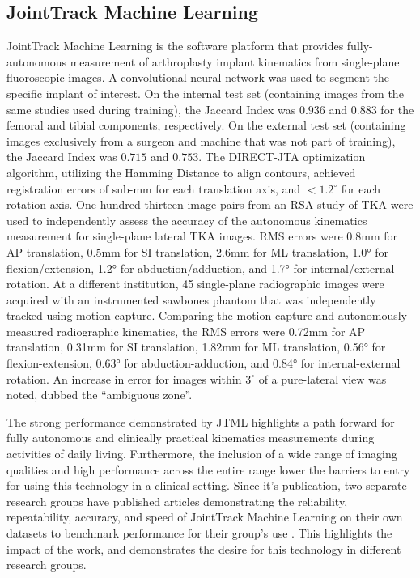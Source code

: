\subsection{JointTrack Machine Learning}
JointTrack Machine Learning is the software platform that provides fully-autonomous measurement of arthroplasty implant kinematics from single-plane fluoroscopic images.
A convolutional neural network was used to segment the specific implant of interest.
On the internal test set (containing images from the same studies used during training), the Jaccard Index was $0.936$ and $0.883$ for the femoral and tibial components, respectively.
On the external test set (containing images exclusively from a surgeon and machine that was not part of training), the Jaccard Index was $0.715$ and $0.753$.
The DIRECT-JTA optimization algorithm, utilizing the Hamming Distance to align contours, achieved registration errors of sub-mm for each translation axis, and $<1.2^{\circ}$ for each rotation axis.
One-hundred thirteen image pairs from an RSA study of TKA were used to independently assess the accuracy of the autonomous kinematics measurement for single-plane lateral TKA images.
RMS errors were 0.8mm for AP translation, 0.5mm for SI translation, 2.6mm for ML translation, 1.0° for flexion/extension, 1.2° for abduction/adduction, and 1.7° for internal/external rotation.
At a different institution, 45 single-plane radiographic images were acquired with an instrumented sawbones phantom that was independently tracked using motion capture.
Comparing the motion capture and autonomously measured radiographic kinematics, the RMS errors were 0.72mm for AP translation, 0.31mm for SI translation, 1.82mm for ML translation, 0.56° for flexion-extension, 0.63° for abduction-adduction, and 0.84° for internal-external rotation.
An increase in error for images within $3^{\circ}$ of a pure-lateral view was noted, dubbed the ``ambiguous zone''.

The strong performance demonstrated by JTML highlights a path forward for fully autonomous and clinically practical kinematics measurements during activities of daily living.
Furthermore, the inclusion of a wide range of imaging qualities and high performance across the entire range lower the barriers to entry for using this technology in a clinical setting.
Since it's publication, two separate research groups have published articles demonstrating the reliability, repeatability, accuracy, and speed of JointTrack Machine Learning on their own datasets to benchmark performance for their group's use \cite{pourtabibSignificantlyBetterPrecision2024,brobergValidationMachineLearning2023}.
This highlights the impact of the work, and demonstrates the desire for this technology in different research groups.

